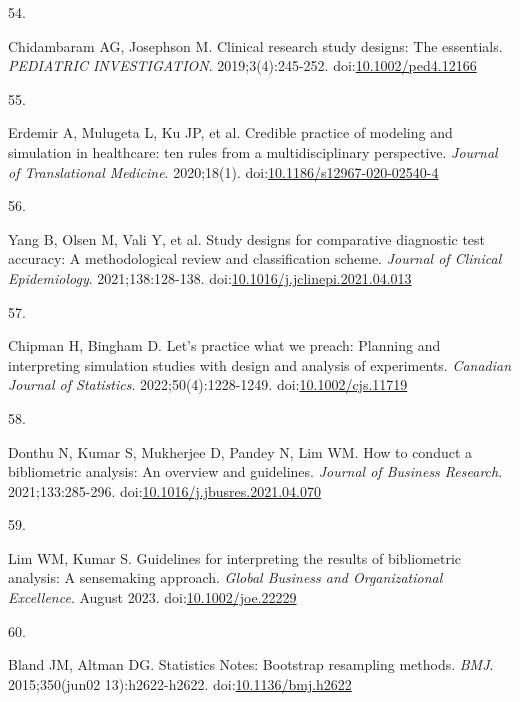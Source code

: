 \documentclass[
]{book}
\newlength{\cslhangindent}
\newlength{\csllabelwidth}
\newlength{\cslentryspacingunit} %
\newenvironment{CSLReferences}[2] %
 {%
  \setlength{\parindent}{0pt}
  \ifodd #1
  \let\oldpar\par
  \def\par{\hangindent=\cslhangindent\oldpar}
  \fi
  \setlength{\parskip}{#2\cslentryspacingunit}
 }%
 {}
\newcommand{\CSLLeftMargin}[1]{\parbox[t]{\csllabelwidth}{#1}}
\newcommand{\CSLRightInline}[1]{\parbox[t]{\linewidth - \csllabelwidth}{#1}\break}
\begin{document}
\begin{CSLReferences}{0}{0}
\leavevmode{}%
\CSLLeftMargin{54. }%
\CSLRightInline{Chidambaram AG, Josephson M. Clinical research study designs: The essentials. \emph{PEDIATRIC INVESTIGATION}. 2019;3(4):245-252. doi:\href{https://doi.org/10.1002/ped4.12166}{10.1002/ped4.12166}}

\leavevmode{}%
\CSLLeftMargin{55. }%
\CSLRightInline{Erdemir A, Mulugeta L, Ku JP, et al. Credible practice of modeling and simulation in healthcare: ten rules from a multidisciplinary perspective. \emph{Journal of Translational Medicine}. 2020;18(1). doi:\href{https://doi.org/10.1186/s12967-020-02540-4}{10.1186/s12967-020-02540-4}}

\leavevmode{}%
\CSLLeftMargin{56. }%
\CSLRightInline{Yang B, Olsen M, Vali Y, et al. Study designs for comparative diagnostic test accuracy: A methodological review and classification scheme. \emph{Journal of Clinical Epidemiology}. 2021;138:128-138. doi:\href{https://doi.org/10.1016/j.jclinepi.2021.04.013}{10.1016/j.jclinepi.2021.04.013}}

\leavevmode{}%
\CSLLeftMargin{57. }%
\CSLRightInline{Chipman H, Bingham D. Let's practice what we preach: Planning and interpreting simulation studies with design and analysis of experiments. \emph{Canadian Journal of Statistics}. 2022;50(4):1228-1249. doi:\href{https://doi.org/10.1002/cjs.11719}{10.1002/cjs.11719}}

\leavevmode{}%
\CSLLeftMargin{58. }%
\CSLRightInline{Donthu N, Kumar S, Mukherjee D, Pandey N, Lim WM. How to conduct a bibliometric analysis: An overview and guidelines. \emph{Journal of Business Research}. 2021;133:285-296. doi:\href{https://doi.org/10.1016/j.jbusres.2021.04.070}{10.1016/j.jbusres.2021.04.070}}

\leavevmode{}%
\CSLLeftMargin{59. }%
\CSLRightInline{Lim WM, Kumar S. Guidelines for interpreting the results of bibliometric analysis: A sensemaking approach. \emph{Global Business and Organizational Excellence}. August 2023. doi:\href{https://doi.org/10.1002/joe.22229}{10.1002/joe.22229}}

\leavevmode{}%
\CSLLeftMargin{60. }%
\CSLRightInline{Bland JM, Altman DG. Statistics Notes: Bootstrap resampling methods. \emph{BMJ}. 2015;350(jun02 13):h2622-h2622. doi:\href{https://doi.org/10.1136/bmj.h2622}{10.1136/bmj.h2622}}


\end{CSLReferences}
\end{document}

